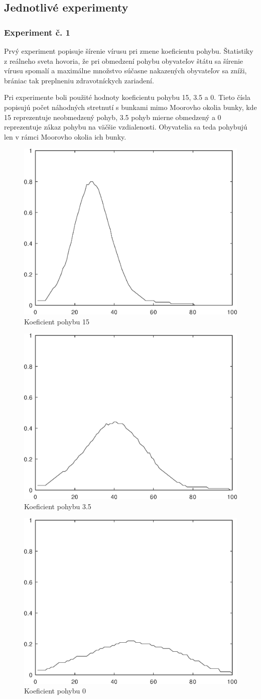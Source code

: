 \documentclass[12pt,a4paper,titlepage]{article}
\begin{document}
\subsection{Jednotlivé experimenty}
\subsubsection{Experiment č. 1}
Prvý experiment popisuje šírenie vírusu pri zmene koeficientu pohybu. Štatistiky z reálneho sveta hovoria, že pri obmedzení pohybu obyvateľov štátu sa šírenie vírusu spomalí a maximálne množstvo súčasne nakazených obyvateľov sa zníži, brániac tak preplneniu zdravotníckych zariadení.

Pri experimente boli použité hodnoty koeficientu pohybu 15, 3.5 a 0. Tieto čísla popisujú počet náhodných stretnutí s bunkami mimo Moorovho okolia bunky, kde 15 reprezentuje neobmedzený pohyb, 3.5 pohyb mierne obmedzený a 0 reprezentuje zákaz pohybu na väčšie vzdialenosti. Obyvatelia sa teda pohybujú len v rámci Moorovho okolia ich bunky.

\begin{figure}[h!]
    \center
    \includegraphics[width=.39\linewidth]{movement-rate-15.eps}
    \caption{Koeficient pohybu 15}
\end{figure}

\begin{figure}[h!]
    \center
    \includegraphics[width=.39\linewidth]{movement-rate-3_5.eps}
    \caption{Koeficient pohybu 3.5}
\end{figure}

\begin{figure}[h!]
    \center
    \includegraphics[width=.39\linewidth]{movement-rate-0.eps}
    \caption{Koeficient pohybu 0}
\end{figure}
\end{document}
